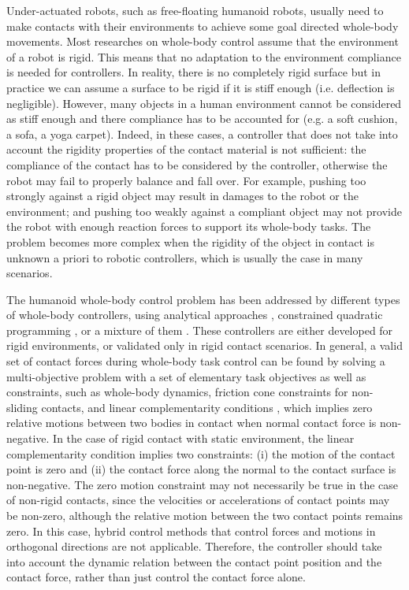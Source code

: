 \documentclass[12pt,a4paper,twoside]{article}
\begin{document}
Under-actuated robots, such as free-floating humanoid robots, usually need to make contacts with their environments to achieve some goal directed whole-body movements. Most researches on whole-body control assume that the environment of a robot is rigid. This means that no adaptation to the environment compliance is needed for controllers. In reality, there is no completely rigid surface but in practice we can assume a surface to be rigid if it is stiff enough (i.e. deflection is negligible). However, many objects in a human environment cannot be considered as stiff enough and there compliance has to be accounted for (e.g. a soft cushion, a sofa, a yoga carpet). Indeed, in these cases, a controller that does not take into account the rigidity properties of the contact material is not sufficient:  the compliance of
the contact has to be considered by the controller, otherwise the robot may fail to properly balance and fall over. For example, pushing too strongly against a rigid object may result in damages to the robot or the environment; and pushing too weakly against a compliant object may not provide the robot with enough reaction forces to support its whole-body tasks. The problem becomes more complex when the rigidity of the object in contact is unknown a priori to robotic controllers, which is usually the case in many scenarios.
 

The humanoid whole-body control problem has been addressed by different types of whole-body controllers, using analytical approaches \cite{Khatib08,Sentis10,Righetti13}, constrained quadratic programming \cite{Abe07,Liu11,Salini11,Salini13,Saab13}, or a mixture of them \cite{Stephens10,Nori15}. These controllers are either developed for rigid environments, or validated only in rigid contact scenarios.
In general, a valid set of contact forces during whole-body task control can be found by solving a multi-objective problem with a set of elementary task objectives as well as constraints, such as whole-body dynamics, friction cone constraints for non-sliding contacts, and linear complementarity conditions \cite{Muico09,Saab13,Salini11,Salini13}, which implies zero relative motions between two bodies in contact when normal contact force is non-negative. In the case of rigid contact with static environment, the linear complementarity condition implies two constraints: (i) the motion of the contact point is zero and (ii) the contact force along the normal to the contact surface is non-negative.  The zero motion constraint may not necessarily be true in the case of non-rigid contacts, since the velocities or accelerations of contact points may be non-zero, although the relative motion between the two contact points remains zero. In this case, hybrid control methods \cite{khatib87} that control forces and motions in orthogonal directions are not applicable. Therefore, the controller should take into account the dynamic relation between the contact point position and the contact force, rather than just control the contact force alone. 
\end{document}
